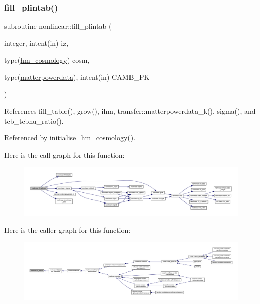 \subsubsection{\texorpdfstring{fill\+\_\+plintab()}{fill\_plintab()}}
{\footnotesize\ttfamily subroutine nonlinear\+::fill\+\_\+plintab (\begin{DoxyParamCaption}\item[{integer, intent(in)}]{iz,  }\item[{type(\mbox{\hyperlink{structnonlinear_1_1hm__cosmology}{hm\+\_\+cosmology}})}]{cosm,  }\item[{type(\mbox{\hyperlink{structtransfer_1_1matterpowerdata}{matterpowerdata}}), intent(in)}]{C\+A\+M\+B\+\_\+\+PK }\end{DoxyParamCaption})\hspace{0.3cm}{\ttfamily [private]}}



References fill\+\_\+table(), grow(), ihm, transfer\+::matterpowerdata\+\_\+k(), sigma(), and tcb\+\_\+tcbnu\+\_\+ratio().



Referenced by initialise\+\_\+hm\+\_\+cosmology().

Here is the call graph for this function\+:
\nopagebreak
\begin{figure}[H]
\begin{center}
\leavevmode
\includegraphics[width=350pt]{namespacenonlinear_af44943bd607e88cf910383917ce03826_cgraph}
\end{center}
\end{figure}
Here is the caller graph for this function\+:
\nopagebreak
\begin{figure}[H]
\begin{center}
\leavevmode
\includegraphics[width=350pt]{namespacenonlinear_af44943bd607e88cf910383917ce03826_icgraph}
\end{center}
\end{figure}
\mbox{\label{namespacenonlinear_a0ec694303c1335ceb97e09d20f0ceb94}} 
